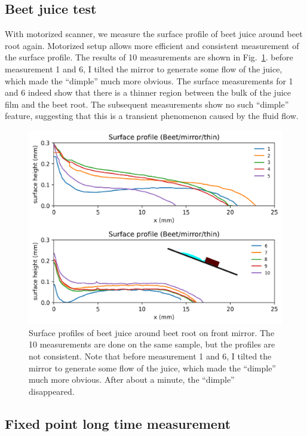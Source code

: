 \documentclass[12pt]{article}
\begin{document}
\subsection{Beet juice test}

With motorized scanner, we measure the surface profile of beet juice around beet root again. Motorized setup allows more efficient and consistent measurement of the surface profile. The results of 10 measurements are shown in Fig.~\ref{fig:surface_profile_measurement_mirror_juice_04102024}. before measurement 1 and 6, I tilted the mirror to generate some flow of the juice, which made the ``dimple'' much more obvious. The surface measurements for 1 and 6 indeed show that there is a thinner region between the bulk of the juice film and the beet root. The subsequent measurements show no such ``dimple'' feature, suggesting that this is a transient phenomenon caused by the fluid flow. 

\begin{figure}
    \centering
    \includegraphics[width=\textwidth]{Figures/surface_profile_measurement_mirror_juice_04102024.pdf}
    \caption{Surface profiles of beet juice around beet root on front mirror. The 10 measurements are done on the same sample, but the profiles are not consistent. Note that before measurement 1 and 6, I tilted the mirror to generate some flow of the juice, which made the ``dimple'' much more obvious. After about a minute, the ``dimple'' disappeared.}
    \label{fig:surface_profile_measurement_mirror_juice_04102024}
\end{figure}

\subsection{Fixed point long time measurement}
\end{document}

